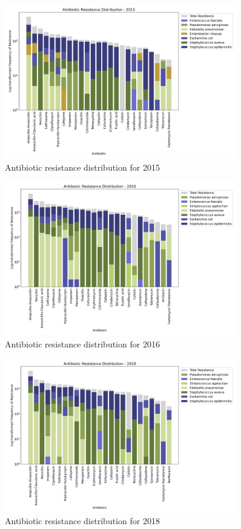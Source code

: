 \documentclass[english,11pt,a4paper,titlepage]{article}
\begin{document}
\begin{figure}[h]
	\centering
	\includegraphics[width=0.9\textwidth]{img/antibiotic_resistance_distribution_filtered_2015.png}
	\caption{Antibiotic resistance distribution for 2015}
	\label{fig:resistance_distribution_2015}
\end{figure}

\begin{figure}[h]
	\centering
	\includegraphics[width=0.9\textwidth]{img/antibiotic_resistance_distribution_filtered_2016.png}
	\caption{Antibiotic resistance distribution for 2016}
	\label{fig:resistance_distribution_2016}
\end{figure}

\begin{figure}[h]
	\centering
	\includegraphics[width=0.9\textwidth]{img/antibiotic_resistance_distribution_filtered_2018.png}
	\caption{Antibiotic resistance distribution for 2018}
	\label{fig:resistance_distribution_2018}
\end{figure}
\end{document}
